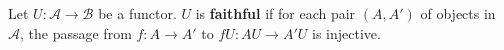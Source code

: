 Let $U: \mathcal{A} \to \mathcal{B}$ be a functor. $U$ is \textbf{faithful} if for each pair $(A, A')$ of objects in $\mathcal{A}$, the passage from $f: A \to A'$ to $fU: AU \to A'U$ is injective.
